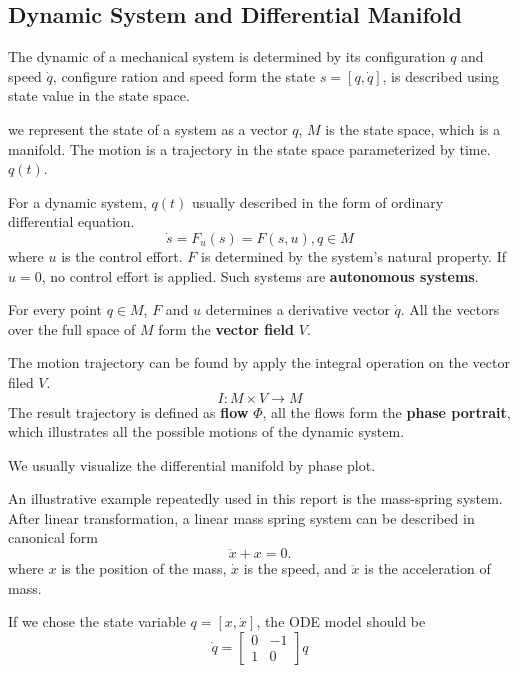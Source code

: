\subsection{Dynamic System and Differential Manifold}

The dynamic of a mechanical system is determined by its configuration  $q$ and speed $\dot{q}$, configure ration and speed form the state $s=[q,\dot{q}]$, is described using state value in the state space.

we represent the state of a system as a vector $q$,  $M$ is the state space, which is a manifold.
The motion is a trajectory in the state space parameterized by time. $q(t)$.


For a dynamic system, $q(t)$ usually described in the form of  ordinary differential equation. 
\begin{equation}
\dot{s}=F_{u}(s)=F(s,u),q\in M
\label{eq:ode}
\end{equation}
where $u$ is the control effort. 
$F$ is determined by the system's natural property.
If $u=0$,  no control effort is applied.
Such systems are \textbf{autonomous systems}.

For every point $q \in M$, 
$F$ and $u$ determines a derivative vector $\dot{q}$. 
All the vectors over the full space of $M$ form the \textbf{vector field} $V$. 

The motion trajectory can be found by apply the integral operation on the vector filed $V$.
\[
I:M \times V \rightarrow M
\]
The result trajectory is defined as \textbf{flow} $\Phi$, all the flows form 
the \textbf{phase portrait}, which illustrates all the possible motions of the dynamic system.

We usually visualize the differential manifold by phase plot.


An illustrative example repeatedly used in this report is the mass-spring system. 
After linear transformation,  
a linear mass spring system can be described in canonical form 
\begin{equation}
\label{eq:mass-spring}
\ddot{x}+x=0.
\end{equation}
where $x$ is the position of the mass, $\dot{x}$ is the speed, and $\ddot{x}$ is the acceleration of mass.
 
If we chose the state variable $q=[x,\dot{x}]$, the ODE model should be 
\[
\dot{q}=
\left[ 
\begin{array}{cc}
0 &-1\\
1 &0 
\end{array}
\right]q
\]




